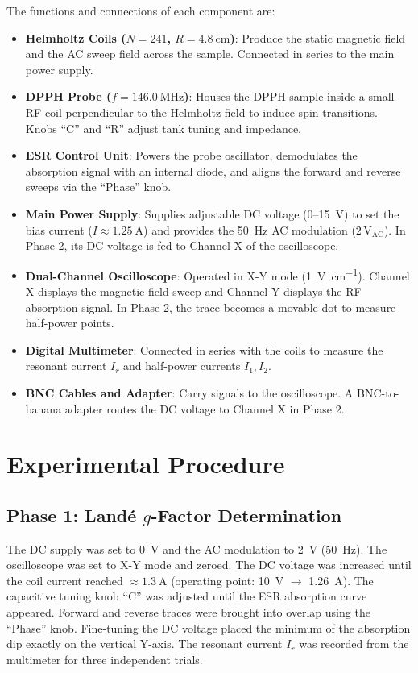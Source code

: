 \documentclass[journal]{IEEEtran}
\begin{document}
The functions and connections of each component are:
\begin{itemize}
    \item \textbf{Helmholtz Coils ($N = 241$, $R = \SI{4.8}{\centi\meter}$)}: Produce the static magnetic field and the AC sweep field across the sample. Connected in series to the main power supply.
    \item \textbf{DPPH Probe ($f = \SI{146.0}{\mega\hertz}$)}: Houses the DPPH sample inside a small RF coil perpendicular to the Helmholtz field to induce spin transitions. Knobs ``C'' and ``R'' adjust tank tuning and impedance.
    \item \textbf{ESR Control Unit}: Powers the probe oscillator, demodulates the absorption signal with an internal diode, and aligns the forward and reverse sweeps via the ``Phase'' knob.
    \item \textbf{Main Power Supply}: Supplies adjustable DC voltage ($0$--\SI{15}{\volt}) to set the bias current ($I \approx \SI{1.25}{\ampere}$) and provides the \SI{50}{\hertz} AC modulation ($2\,\mathrm{V}_{\text{AC}}$). In Phase 2, its DC voltage is fed to Channel X of the oscilloscope.
    \item \textbf{Dual-Channel Oscilloscope}: Operated in X-Y mode (\SI{1}{\volt\per\centi\meter}). Channel X displays the magnetic field sweep and Channel Y displays the RF absorption signal. In Phase 2, the trace becomes a movable dot to measure half-power points.
    \item \textbf{Digital Multimeter}: Connected in series with the coils to measure the resonant current $I_r$ and half-power currents $I_1, I_2$.
    \item \textbf{BNC Cables and Adapter}: Carry signals to the oscilloscope. A BNC-to-banana adapter routes the DC voltage to Channel X in Phase 2.
\end{itemize}

\section{Experimental Procedure}

\subsection{Phase 1: Land\'e \texorpdfstring{$g$}{g}-Factor Determination}
The DC supply was set to \SI{0}{\volt} and the AC modulation to \SI{2}{\volt} (\SI{50}{\hertz}). The oscilloscope was set to X-Y mode and zeroed. The DC voltage was increased until the coil current reached $\approx \SI{1.3}{\ampere}$ (operating point: \SI{10}{\volt} $\rightarrow$ \SI{1.26}{\ampere}). The capacitive tuning knob ``C'' was adjusted until the ESR absorption curve appeared. Forward and reverse traces were brought into overlap using the ``Phase'' knob. Fine-tuning the DC voltage placed the minimum of the absorption dip exactly on the vertical Y-axis. The resonant current $I_r$ was recorded from the multimeter for three independent trials.
\end{document}
